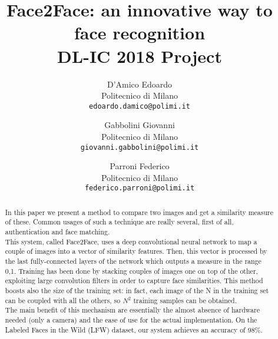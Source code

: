 \documentclass[10pt,twocolumn,letterpaper]{article}
\begin{document}
\title{Face2Face: an innovative way to face recognition \\ DL-IC 2018 Project} 

\author{D'Amico Edoardo\\
Politecnico di Milano\\
{\tt\small edoardo.damico@polimi.it}
\and
Gabbolini Giovanni\\
Politecnico di Milano\\
{\tt\small giovanni.gabbolini@polimi.it}
\and
Parroni Federico\\
Politecnico di Milano\\
{\tt\small federico.parroni@polimi.it}
}

\maketitle

\begin{abstract}
In this paper we present a method to compare two images and get a similarity measure of these. Common usages of such a technique are really several, first of all, authentication and face matching.
\\
This system, called Face2Face, uses a deep convolutional neural network to map a couple of images into a vector of similarity features. Then, this vector is processed by the last fully-connected layers of the network which outputs a measure in the range 0,1. Training has been done by stacking couples of images one on top of the other, exploiting large convolution filters in order to capture face similarities. This method boosts also the size of the training set: in fact, each image of the N in the training set can be coupled with all the others, so $N^2$ training samples can be obtained.
\\
The main benefit of this mechanism are essentially the almost absence of hardware needed (only a camera) and the ease of use for the actual implementation. 
On the Labeled Faces in the Wild (LFW) dataset, our system achieves an accuracy of 98\%.
\end{abstract}

\end{document}
